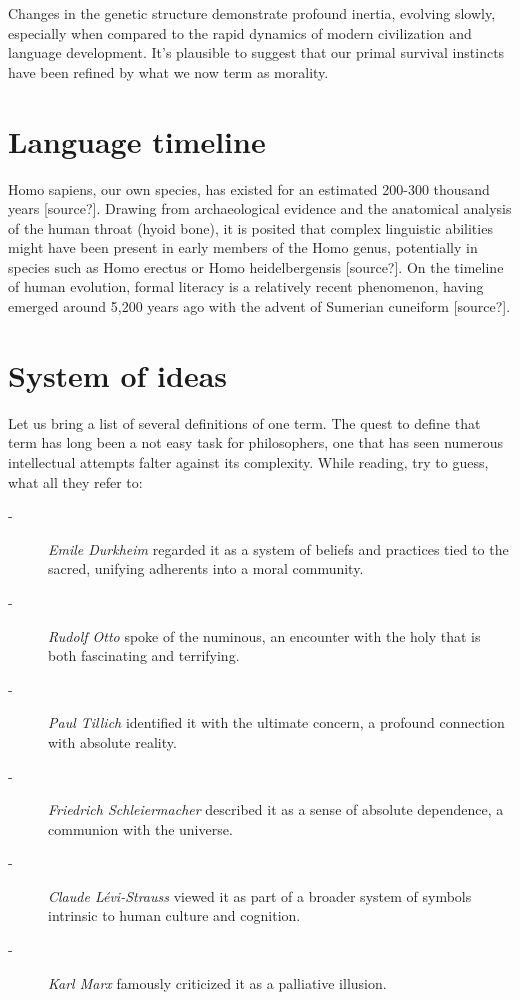 \documentclass[12pt,a4]{article}
\begin{document}
\par
Changes in the genetic structure demonstrate profound inertia, evolving slowly, especially when compared to the rapid dynamics of modern civilization and language development. It's plausible to suggest that our primal survival instincts have been refined by what we now term as morality.



\section{Language timeline}

Homo sapiens, our own species, has existed for an estimated 200-300 thousand years [source?]. Drawing from archaeological evidence and the anatomical analysis of the human throat (hyoid bone), it is posited that complex linguistic abilities might have been present in early members of the Homo genus, potentially in species such as Homo erectus or Homo heidelbergensis [source?]. On the timeline of human evolution, formal literacy is a relatively recent phenomenon, having emerged around 5,200 years ago with the advent of Sumerian cuneiform [source?].


 


 

\section{System of ideas}
Let us bring a list of several definitions of one term. The quest to define that term has long been a not easy task for philosophers, one that has seen numerous intellectual attempts falter against its complexity. 
While reading, try to guess, what all they refer to:  

\begin{description}
    \item[-] \textit{Emile Durkheim} regarded it as a system of beliefs and practices tied to the sacred, unifying adherents into a moral community.
    \item[-] \textit{Rudolf Otto} spoke of the numinous, an encounter with the holy that is both fascinating and terrifying.
    \item[-] \textit{Paul Tillich }identified it with the ultimate concern, a profound connection with absolute reality.
    \item[-] \textit{Friedrich Schleiermacher} described it as a sense of absolute dependence, a communion with the universe.
    \item[-] \textit{Claude Lévi-Strauss} viewed it as part of a broader system of symbols intrinsic to human culture and cognition.
    \item[-] \textit{Karl Marx} famously criticized it as a palliative illusion.
\end{description}    
\end{document}
